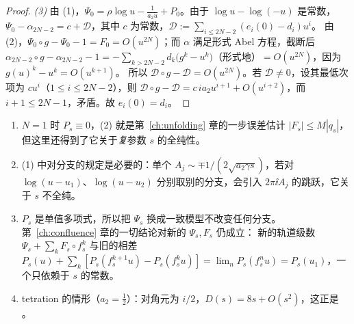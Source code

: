 \begin{proof}
\emph{(3)} 由 (1)，$\Psi_0=\rho\log u-\frac1{a_2u}+P_0$。由于 $\log u-\log(-u)$ 是常数，$\Psi_0-\alpha_{2N-2}=c+\mathcal D$，其中 $c$ 为常数，$\mathcal D:=\sum_{i\le2N-2}(e_i(0)-d_i)u^i$。
由 (2)，$\Psi_0\circ g-\Psi_0-1=F_0=O(u^{2N})$；而 $\alpha$ 满足形式 Abel 方程，截断后
$\alpha_{2N-2}\circ g-\alpha_{2N-2}-1=-\sum_{k>2N-2}d_k\bigl(g^k-u^k\bigr)$（形式地）$=O(u^{2N})$，因为 $g(u)^k-u^k=O(u^{k+1})$。
所以 $\mathcal D\circ g-\mathcal D=O(u^{2N})$。若 $\mathcal D\ne0$，设其最低次项为 $cu^i$（$1\le i\le2N-2$），则
$\mathcal D\circ g-\mathcal D=c\,ia_2u^{i+1}+O(u^{i+2})$，而 $i+1\le2N-1$，矛盾。故 $e_i(0)=d_i$。
\end{proof}

\begin{remark}\label{ch8:rem:model}
\begin{enumerate}
\item $N=1$ 时 $P_s\equiv0$，(2) 就是第~\ref{ch:unfolding} 章的一步误差估计 $|F_s|\le M|q_s|$，但这里还得到了它关于\emph{复}参数 $s$ 的全纯性。
\item (1) 中对分支的规定是必要的：单个 $A_j\sim\mp1/(2\sqrt{a_2\gamma s})$，若对 $\log(u-u_1)$、$\log(u-u_2)$ 分别取别的分支，会引入
  $2\pi\ii A_j$ 的跳跃，它关于 $s$ 不全纯。
\item $P_s$ 是单值多项式，所以把 $\Psi_s$ 换成一致模型不改变任何分支。第~\ref{ch:confluence} 章的一切结论对新的 $\Psi_s,F_s$ 仍成立：
  新的轨道级数 $\Psi_s+\sum_kF_s\circ f_s^k$ 与旧的相差 $P_s(u)+\sum_k[P_s(f_s^{k+1}u)-P_s(f_s^ku)]=\lim_nP_s(f_s^nu)=P_s(u_1)$，一个只依赖于 $s$ 的常数。
\item tetration 的情形（$a_2=\frac12$）：对角元为 $i/2$，$D(s)=8s+O(s^2)$，这正是 \cite[引理~5.1]{KneserPaper}。
\end{enumerate}
\end{remark}

